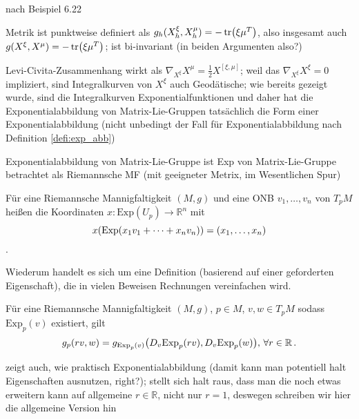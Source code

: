 \begin{bsp}
nach Beispiel 6.22

Metrik ist punktweise definiert als $g_h(X^\xi_h, X^\mu_h) = - \tr(\xi \mu^T)$, also insgesamt auch $g(X^\xi, X^\mu) = - \tr(\xi \mu^T)$; ist bi-invariant (in beiden Argumenten also?)

Levi-Civita-Zusammenhang wirkt als $\nabla_{X^\xi} X^\mu = \frac{1}{2} X^{[\xi, \mu]}$; weil das $\nabla_{X^\xi} X^\xi = 0$ impliziert, sind Integralkurven von $X^\xi$ auch Geodätische; wie bereits gezeigt wurde, sind die Integralkurven Exponentialfunktionen und daher hat die Exponentialabbildung von Matrix-Lie-Gruppen tatsächlich die Form einer Exponentialabbildung (nicht unbedingt der Fall für Exponentialabbildung nach Definition \ref{defi:exp_abb})

Exponentialabbildung von Matrix-Lie-Gruppe ist Exp von Matrix-Lie-Gruppe betrachtet als Riemannsche MF (mit geeigneter Metrix, im Wesentlichen Spur)
\end{bsp}


\begin{defi}
Für eine Riemannsche Mannigfaltigkeit $(M, g)$ und eine ONB $v_1, \dots, v_n$ von $T_p M$ heißen die Koordinaten $x: \text{Exp}(U_p) \rightarrow \mathbb{R}^n$ mit
\begin{equation}
x(\text{Exp}(x_1 v_1 + \dots + x_n v_n)) = \qty(x_1, \dots, x_n)
\end{equation}
.
\end{defi}

Wiederum handelt es sich um eine Definition (basierend auf einer geforderten Eigenschaft), die in vielen Beweisen Rechnungen vereinfachen wird.

\begin{lemma}
Für eine Riemannsche Mannigfaltigkeit $(M, g)$, $p \in M$, $v, w \in T_p M$ sodass $\text{Exp}_p (v)$ existiert, gilt
\begin{equation}
g_p(r v, w) = g_{\text{Exp}_p(v)} \qty(D_v \text{Exp}_p (r v), D_v \text{Exp}_p (w)), \, \forall r \in \mathbb{R} \, .
\end{equation}
\end{lemma}
zeigt auch, wie praktisch Exponentialabbildung (damit kann man potentiell halt Eigenschaften ausnutzen, right?); stellt sich halt raus, dass man die noch etwas erweitern kann auf allgemeine $r \in \mathbb{R}$, nicht nur $r = 1$, deswegen schreiben wir hier die allgemeine Version hin


